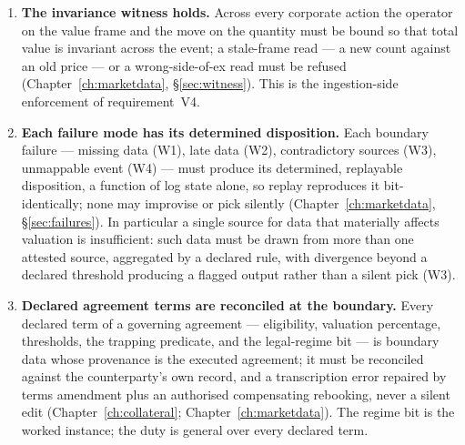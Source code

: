 \documentclass[11pt,a4paper]{article}
\begin{document}
\begin{enumerate}[label=\textbf{B\arabic*.}, ref=B\arabic*, leftmargin=*, itemsep=3pt]
  never be overwritten by its adjustment.
\item \textbf{The invariance witness holds.} Across every corporate action the operator on
  the value frame and the move on the quantity must be bound so that total value is
  invariant across the event; a stale-frame read --- a new count against an old price ---
  or a wrong-side-of-ex read must be refused
  (Chapter~\ref{ch:marketdata}, \S\ref{sec:witness}). This is the ingestion-side
  enforcement of requirement~V4.
\item \textbf{Each failure mode has its determined disposition.} Each boundary failure
  --- missing data (W1), late data (W2), contradictory sources (W3), unmappable event
  (W4) --- must produce its determined, replayable disposition, a function of log state
  alone, so replay reproduces it bit-identically; none may improvise or pick silently
  (Chapter~\ref{ch:marketdata}, \S\ref{sec:failures}). In particular a single source for
  data that materially affects valuation is insufficient: such data must be drawn from
  more than one attested source, aggregated by a declared rule, with divergence beyond a
  declared threshold producing a flagged output rather than a silent pick (W3).
\item \textbf{Declared agreement terms are reconciled at the boundary.} Every declared
  term of a governing agreement --- eligibility, valuation percentage, thresholds, the
  trapping predicate, and the legal-regime bit --- is boundary data whose provenance is the
  executed agreement; it must be reconciled against the counterparty's own record, and a
  transcription error repaired by terms amendment plus an authorised compensating rebooking, never a
  silent edit (Chapter~\ref{ch:collateral}; Chapter~\ref{ch:marketdata}). The regime bit is
  the worked instance; the duty is general over every declared term.
\end{enumerate}
\end{document}
